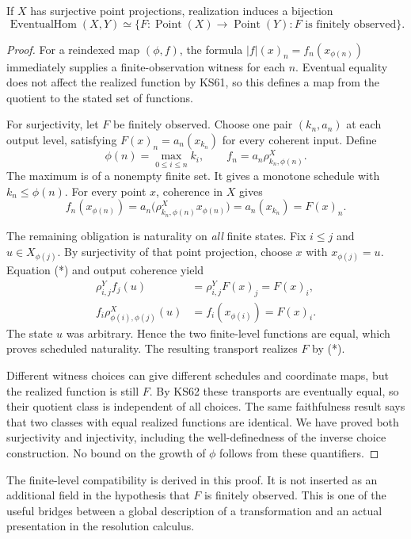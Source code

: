 \begin{theorem}\label{KS63}
If \(X\) has surjective point projections, realization induces a bijection
\[
 \operatorname{EventualHom}(X,Y)
 \simeq
 \{F:\operatorname{Point}(X)\to\operatorname{Point}(Y):F
 \text{ is finitely observed}\}.
\]
\end{theorem}
\begin{proof}
For a reindexed map $(\phi,f)$, the formula $|f|(x)_n=f_n(x_{\phi(n)})$ immediately supplies a finite-observation witness for each $n$. Eventual equality does not affect the realized function by KS61, so this defines a map from the quotient to the stated set of functions.

For surjectivity, let $F$ be finitely observed. Choose one pair $(k_n,a_n)$ at each output level, satisfying $F(x)_n=a_n(x_{k_n})$ for every coherent input. Define
\[
 \phi(n)=\max_{0\le i\le n}k_i,
 \qquad f_n=a_n\rho^X_{k_n,\phi(n)}.
\]
The maximum is of a nonempty finite set. It gives a monotone schedule with $k_n\le\phi(n)$. For every point $x$, coherence in $X$ gives
\[
 f_n(x_{\phi(n)})
 =a_n\bigl(\rho^X_{k_n,\phi(n)}x_{\phi(n)}\bigr)
 =a_n(x_{k_n})=F(x)_n.                                      \tag{*}
\]

The remaining obligation is naturality on \emph{all} finite states. Fix $i\le j$ and $u\in X_{\phi(j)}$. By surjectivity of that point projection, choose $x$ with $x_{\phi(j)}=u$. Equation (*) and output coherence yield
\[
\begin{aligned}
 \rho^Y_{i,j}f_j(u)&=\rho^Y_{i,j}F(x)_j=F(x)_i,\\
 f_i\rho^X_{\phi(i),\phi(j)}(u)&=f_i(x_{\phi(i)})=F(x)_i.
\end{aligned}
\]
The state $u$ was arbitrary. Hence the two finite-level functions are equal, which proves scheduled naturality. The resulting transport realizes $F$ by (*).

Different witness choices can give different schedules and coordinate maps, but the realized function is still $F$. By KS62 these transports are eventually equal, so their quotient class is independent of all choices. The same faithfulness result says that two classes with equal realized functions are identical. We have proved both surjectivity and injectivity, including the well-definedness of the inverse choice construction. No bound on the growth of $\phi$ follows from these quantifiers.
\end{proof}
The finite-level compatibility is derived in this proof. It is not inserted as an additional field in the hypothesis that \(F\) is finitely observed. This is one of the useful bridges between a global description of a transformation and an actual presentation in the resolution calculus.

